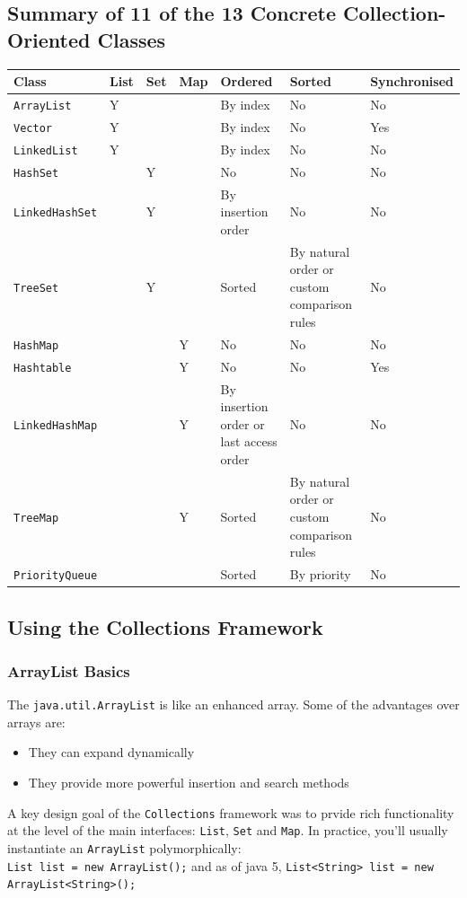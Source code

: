 \subsection{Summary of 11 of the 13 Concrete Collection-Oriented Classes}
\begin{center}
\begin{tabular}{llllp{4cm}p{4cm}l}
    \textbf{Class} & \textbf{List} & \textbf{Set} & \textbf{Map} & 
    \textbf{Ordered} & \textbf{Sorted} & Synchronised \\
    \hline
    \verb#ArrayList# & Y & & & By index & No & No \\
    \verb#Vector# & Y & & & By index & No & Yes \\
    \verb#LinkedList# & Y & & & By index & No & No \\
    \hline
    \verb#HashSet# & & Y & & No & No & No \\
    \verb#LinkedHashSet# & & Y & & By insertion order & No & No \\
    \verb#TreeSet# & & Y & & Sorted & By natural order or custom comparison 
    rules & No \\
    \hline
    \verb#HashMap# & & & Y & No & No & No \\
    \verb#Hashtable# & & & Y & No & No & Yes \\
    \verb#LinkedHashMap# & & & Y & By insertion order or last access order & No 
    & No \\
    \verb#TreeMap# & & & Y & Sorted & By natural order or custom comparison 
    rules & No \\
    \hline
    \verb#PriorityQueue# & & & & Sorted & By priority & No \\
\end{tabular}
\end{center}

\subsection{Using the Collections Framework}
\subsubsection{ArrayList Basics}
The \verb#java.util.ArrayList# is like an enhanced array. Some of the 
advantages over arrays are:
\begin{itemize}
    \item They can expand dynamically
    \item They provide more powerful insertion and search methods
\end{itemize}
A key design goal of the \verb#Collections# framework was to prvide rich 
functionality at the level of the main interfaces: \verb#List#, \verb#Set# and 
\verb#Map#. In practice, you'll usually instantiate an \verb#ArrayList# 
polymorphically:\\
\verb#List list = new ArrayList();# and as of java 5,
\verb#List<String> list = new ArrayList<String>();#

